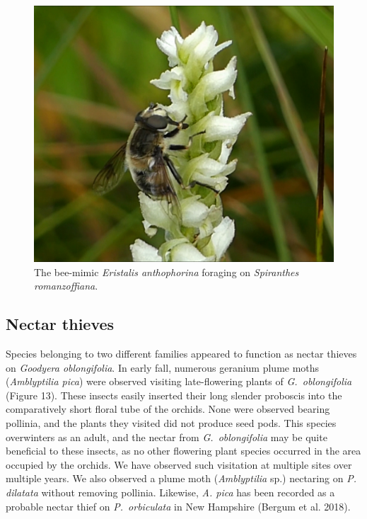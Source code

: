 \begin{multicols}{2}
\begin{figure}[H]
\begin{center}
\vspace{2mm}
\includegraphics[width=\textwidth]{img/Spiranthes_romanzoffiana_Eristalis_anthophorina.jpg}
\caption{The bee-mimic \emph{Eristalis anthophorina} foraging on \emph{Spiranthes romanzoffiana}.}
\label{Spiranthes_romanzoffiana_Eristalis_anthophorina}
\end{center}
\end{figure}



\subsection{Nectar thieves}

Species belonging to two different families appeared to function as
nectar thieves on \emph{Goodyera oblongifolia}. In early fall, numerous
geranium plume moths (\emph{Amblyptilia pica}) were observed visiting
late-flowering plants of \emph{G.\ oblongifolia} (Figure 13). These
insects easily inserted their long slender proboscis into the
comparatively short floral tube of the orchids. None were observed
bearing pollinia, and the plants they visited did not produce seed pods.
This species overwinters as an adult, and the nectar from \emph{G.\
oblongifolia} may be quite beneficial to these insects, as no other
flowering plant species occurred in the area occupied by the orchids. We
have observed such visitation at multiple sites over multiple years. We
also observed a plume moth (\emph{Amblyptilia} sp.) nectaring on \emph{P.
dilatata} without removing pollinia. Likewise, \emph{A. pica} has been
recorded as a probable nectar thief on \emph{P.\ orbiculata} in New
Hampshire (Bergum et al. 2018).


\end{multicols}
